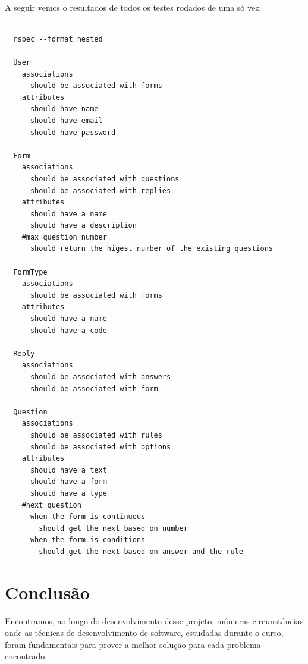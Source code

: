 \documentclass[11pt]{article}
\begin{document}
    \paragraph{}
    
    A seguir vemos o resultados de todos os testes rodados de uma
    só vez:
    
    {\scriptsize
      \lstset{language=Bash}
      \begin{lstlisting}

  rspec --format nested 
  
  User
    associations
      should be associated with forms
    attributes
      should have name
      should have email
      should have password

  Form
    associations
      should be associated with questions
      should be associated with replies
    attributes
      should have a name
      should have a description
    #max_question_number
      should return the higest number of the existing questions

  FormType
    associations
      should be associated with forms
    attributes
      should have a name
      should have a code

  Reply
    associations
      should be associated with answers
      should be associated with form
    
  Question
    associations
      should be associated with rules
      should be associated with options
    attributes
      should have a text
      should have a form
      should have a type
    #next_question
      when the form is continuous
        should get the next based on number
      when the form is conditions
        should get the next based on answer and the rule
      \end{lstlisting}
    }
    
    
  \clearpage
      
  \section{Conclusão}

    \paragraph{}
    Encontramos, ao longo do desenvolvimento desse projeto, inúmeras 
    circunstâncias onde as técnicas de desenvolvimento de software, 
    estudadas durante o curso, foram fundamentais para prover a melhor 
    solução para cada problema encontrado.
    
\end{document}
